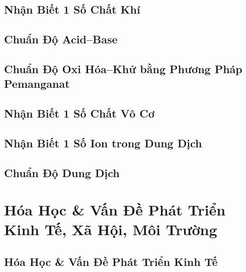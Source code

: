 \documentclass{article}
\numberwithin{equation}{section}
\begin{document}
\subsection{Nhận Biết 1 Số Chất Khí}


\subsection{Chuẩn Độ Acid--Base}


\subsection{Chuẩn Độ Oxi Hóa--Khử bằng Phương Pháp Pemanganat}


\subsection{Nhận Biết 1 Số Chất Vô Cơ}


\subsection{Nhận Biết 1 Số Ion trong Dung Dịch}


\subsection{Chuẩn Độ Dung Dịch}


\section{Hóa Học \& Vấn Đề Phát Triển Kinh Tế, Xã Hội, Môi Trường}

\subsection{Hóa Học \& Vấn Đề Phát Triển Kinh Tế}
\end{document}
